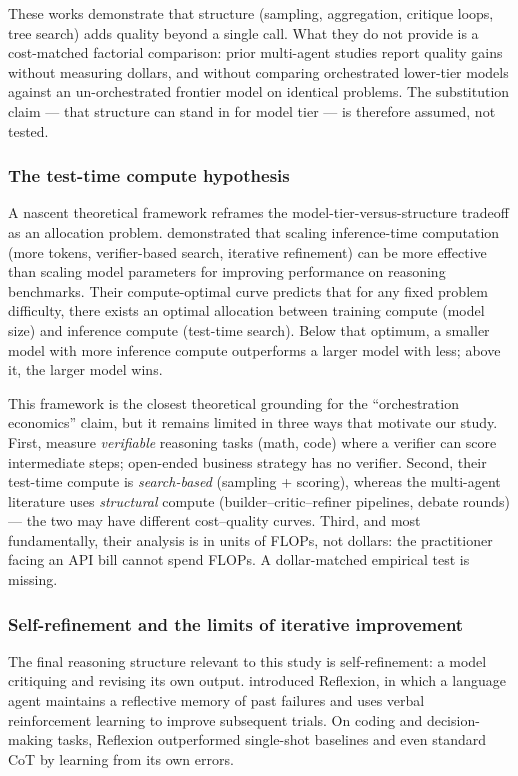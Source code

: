 \documentclass[12pt,a4paper]{article}
\begin{document}
These works demonstrate that structure (sampling, aggregation, critique loops,
tree search) adds quality beyond a single call. What they do not provide is a
cost-matched factorial comparison: prior multi-agent studies report quality
gains without measuring dollars, and without comparing orchestrated lower-tier models
against an un-orchestrated frontier model on identical problems. The
substitution claim --- that structure can stand in for model tier --- is
therefore assumed, not tested.

\subsubsection{The test-time compute hypothesis}

A nascent theoretical framework reframes the model-tier-versus-structure
tradeoff as an allocation problem. \citet{SnellEtAl2024} demonstrated that
scaling inference-time computation (more tokens, verifier-based search,
iterative refinement) can be more effective than scaling model parameters for
improving performance on reasoning benchmarks. Their compute-optimal curve
predicts that for any fixed problem difficulty, there exists an optimal
allocation between training compute (model size) and inference compute
(test-time search). Below that optimum, a smaller model with more inference
compute outperforms a larger model with less; above it, the larger model wins.

This framework is the closest theoretical grounding for the ``orchestration
economics'' claim, but it remains limited in three ways that motivate our study.
First, \citet{SnellEtAl2024} measure \emph{verifiable} reasoning tasks (math,
code) where a verifier can score intermediate steps; open-ended business
strategy has no verifier. Second, their test-time compute is
\emph{search-based} (sampling + scoring), whereas the multi-agent literature
uses \emph{structural} compute (builder--critic--refiner pipelines, debate
rounds) --- the two may have different cost--quality curves. Third, and most
fundamentally, their analysis is in units of FLOPs, not dollars: the
practitioner facing an API bill cannot spend FLOPs. A dollar-matched empirical
test is missing.

\subsubsection{Self-refinement and the limits of iterative improvement}

The final reasoning structure relevant to this study is self-refinement: a
model critiquing and revising its own output. \citet{ShinnEtAl2023} introduced
Reflexion, in which a language agent maintains a reflective memory of past
failures and uses verbal reinforcement learning to improve subsequent trials.
On coding and decision-making tasks, Reflexion outperformed single-shot
baselines and even standard CoT by learning from its own errors.
\end{document}
